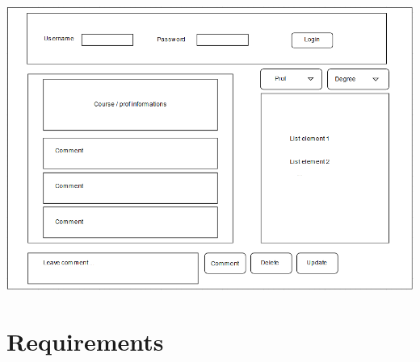 \documentclass[a4paper, oneside]{article}
\begin{document}
\begin{minipage}{\linewidth}
\begin{center}
\vspace{8mm}
\includegraphics[width=150mm]{./images/diagrams/Mockup.pdf} 
\vspace{3mm}
\label{fig:mockup}
\end{center}
\end{minipage}

\clearpage

\section{Requirements}
\end{document}
